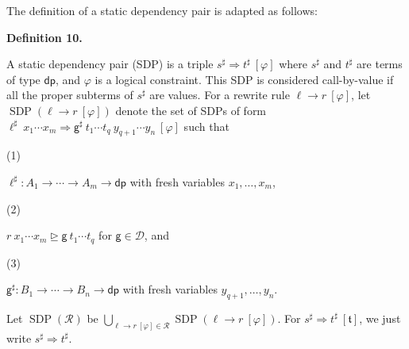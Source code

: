 \documentclass[10pt,a4paper]{amsart}
\begin{document}
 
 
 
The definition of a static dependency pair is adapted as follows:\par
 
 
 
\par\medskip\noindent\textbf{Definition 10.}\par
 
 
A static dependency pair (SDP) is a triple ${s^{\sharp}}\Rightarrow{t^{\sharp}}\ [\varphi]$ where $s^{\sharp}$ and $t^{\sharp}$ are terms of type $\mathsf{dp}$, and $\varphi$ is a logical constraint. This SDP is considered call-by-value if all the proper subterms of $s^{\sharp}$ are values. For a rewrite rule ${\ell}\rightarrow{r}\ [\varphi]$, let $\operatorname{SDP}({\ell}\rightarrow{r}\ [\varphi])$ denote the set of SDPs of form ${{\ell^{\sharp}}\ {{x}_{1}\cdots{x}_{m}}}\Rightarrow{{{\mathsf{g}^{\sharp}}\ {{t}_{1}\cdots{t}_{q}}}\ {{y}_{q+1}\cdots{y}_{n}}}\ [\varphi]$ such that\par
  
\par\noindent  (1) 
 
$\ell^{\sharp}:{A}_{1}\rightarrow\cdots\rightarrow{A}_{m}\rightarrow\mathsf{dp}$ with fresh variables ${x}_{1},\ldots,{x}_{m}$,\par
 
 
 
\par\noindent  (2) 
 
${r}\ {{x}_{1}\cdots{x}_{m}}\trianglerighteq{\mathsf{g}}\ {{t}_{1}\cdots{t}_{q}}$ for $\mathsf{g}\in\mathcal{D}$, and\par
 
 
 
\par\noindent  (3) 
 
$\mathsf{g}^{\sharp}:{B}_{1}\rightarrow\cdots\rightarrow{B}_{n}\rightarrow\mathsf{dp}$ with fresh variables ${y}_{q+1},\ldots,{y}_{n}$.\par
 
 
  
Let $\operatorname{SDP}(\mathcal{R})$ be $\bigcup_{{\ell}\rightarrow{r}\ [\varphi]\in\mathcal{R}}\operatorname{SDP}({\ell}\rightarrow{r}\ [\varphi])$. For ${s^{\sharp}}\Rightarrow{t^{\sharp}}\ [\mathfrak{t}]$, we just write ${s^{\sharp}}\Rightarrow{t^{\sharp}}$.\par
 
\end{document}
